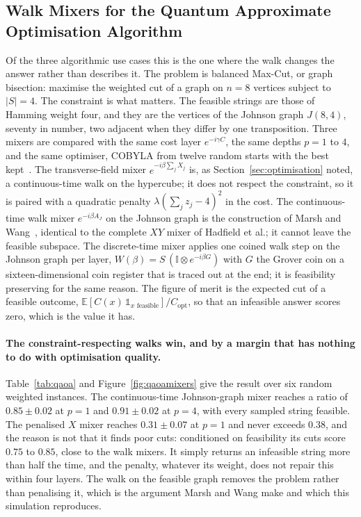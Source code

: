 

\subsection{Walk Mixers for the Quantum Approximate Optimisation Algorithm}
\label{sec:res-qaoa}

Of the three algorithmic use cases this is the one where the walk changes the
answer rather than describes it. The problem is balanced Max-Cut, or graph
bisection: maximise the weighted cut of a graph on $n = 8$ vertices subject to
$|S| = 4$. The constraint is what matters. The feasible strings are those of
Hamming weight four, and they are the vertices of the Johnson graph $J(8,4)$,
seventy in number, two adjacent when they differ by one transposition. Three
mixers are compared with the same cost layer $e^{-i\gamma C}$, the same
depths $p = 1$ to $4$, and the same optimiser, COBYLA from twelve random
starts with the best kept~\cite{Farhi_2014, Hadfield_2019}. The transverse-field
mixer $e^{-i\beta\sum_j X_j}$ is, as Section~\ref{sec:optimisation} noted, a
continuous-time walk on the hypercube; it does not respect the constraint, so
it is paired with a quadratic penalty $\lambda(\sum_j z_j - 4)^2$ in the
cost. The continuous-time walk mixer $e^{-i\beta A_J}$ on the Johnson graph is
the construction of Marsh and Wang~\cite{Marsh_2019, Marsh_2020}, identical to
the complete $XY$ mixer of Hadfield et al.; it cannot leave the feasible
subspace. The discrete-time mixer applies one coined walk step on the Johnson
graph per layer, $W(\beta) = S\,(\mathbb{I} \otimes e^{-i\beta G})$ with $G$
the Grover coin on a sixteen-dimensional coin register that is traced out at
the end; it is feasibility preserving for the same reason. The figure of merit
is the expected cut of a feasible outcome, $\mathbb{E}[C(x)\,\mathbb{1}_{x
\text{ feasible}}]/C_{\mathrm{opt}}$, so that an infeasible answer scores
zero, which is the value it has.

\paragraph*{The constraint-respecting walks win, and by a margin that has
nothing to do with optimisation quality.}
Table~\ref{tab:qaoa} and Figure~\ref{fig:qaoamixers} give the result over six
random weighted instances. The continuous-time Johnson-graph mixer reaches a
ratio of $0.85 \pm 0.02$ at $p=1$ and $0.91 \pm 0.02$ at $p=4$, with every
sampled string feasible. The penalised $X$ mixer reaches $0.31 \pm 0.07$ at
$p=1$ and never exceeds $0.38$, and the reason is not that it finds poor cuts:
conditioned on feasibility its cuts score $0.75$ to $0.85$, close to the walk
mixers. It simply returns an infeasible string more than half the time, and
the penalty, whatever its weight, does not repair this within four layers.
The walk on the feasible graph removes the problem rather than penalising it,
which is the argument Marsh and Wang make and which this simulation
reproduces.

